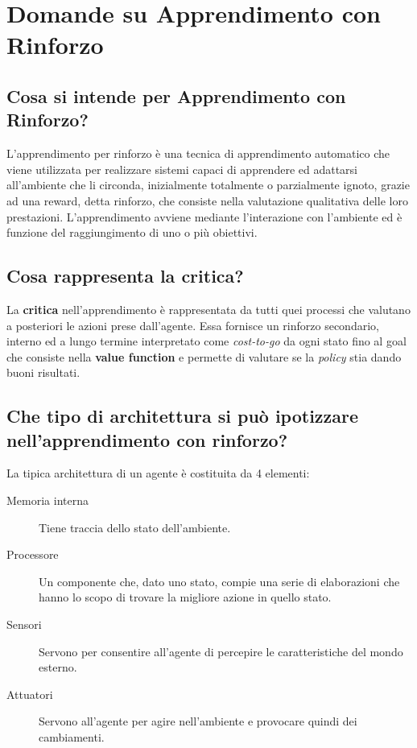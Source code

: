 \documentclass[\main/main.tex]{subfiles}
\begin{document}
\section{Domande su Apprendimento con Rinforzo}
\subsection{Cosa si intende per Apprendimento con Rinforzo?}
L'apprendimento per rinforzo è una tecnica di apprendimento automatico che viene utilizzata per realizzare sistemi capaci di apprendere ed adattarsi all'ambiente che li circonda, inizialmente totalmente o parzialmente ignoto, grazie ad una reward, detta rinforzo, che consiste nella valutazione qualitativa delle loro prestazioni. L'apprendimento avviene mediante l'interazione con l'ambiente ed è funzione del raggiungimento di uno o più obiettivi.



\subsection{Cosa rappresenta la critica?}
La \textbf{critica} nell'apprendimento è rappresentata da tutti quei processi che valutano a posteriori le azioni prese dall'agente. Essa fornisce un rinforzo secondario, interno ed a lungo termine interpretato come \textit{cost-to-go} da ogni stato fino al goal che consiste nella \textbf{value function} e permette di valutare se la \textit{policy} stia dando buoni risultati.

\subsection{Che tipo di architettura si può ipotizzare nell'apprendimento con rinforzo?}
La tipica architettura di un agente è costituita da 4 elementi:
\begin{description}
  \item[Memoria interna] Tiene traccia dello stato dell'ambiente.
  \item[Processore] Un componente che, dato uno stato, compie una serie di elaborazioni che hanno lo scopo di trovare la migliore azione in quello stato.
  \item[Sensori] Servono per consentire all'agente di percepire le caratteristiche del mondo esterno.
  \item[Attuatori] Servono all'agente per agire nell'ambiente e provocare quindi dei cambiamenti.
\end{description}
\end{document}
